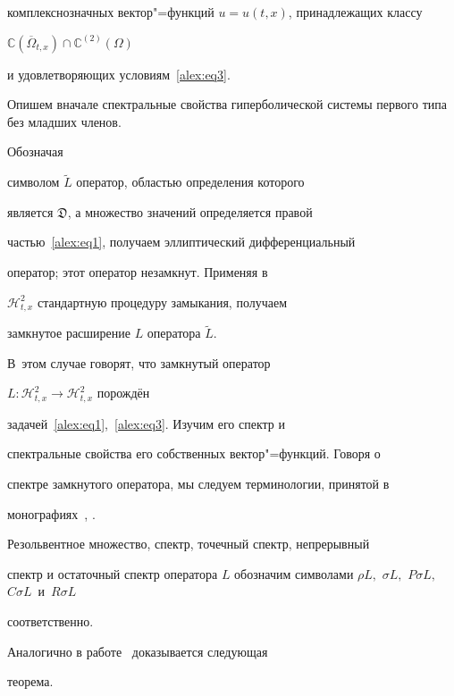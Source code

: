 комплекснозначных вектор"=функций $u=u(t,x)$, принадлежащих классу

${\mathbb{C}\left(\overline{\Omega}_{t,x}\right)}\cap{\mathbb{C}^{(2)}\left(\Omega\right)}$

и удовлетворяющих условиям~\eqref{alex:eq3}.

Опишем вначале спектральные свойства гиперболической системы первого типа без младших членов.



\smallskip



 Обозначая

символом $\widetilde{L}$ оператор, областью определения которого

является $\mathfrak{D}$, а множество значений определяется правой

частью~\eqref{alex:eq1}, получаем  эллиптический дифференциальный

оператор; этот оператор незамкнут. Применяя в

$\mathcal{H}^2_{t,x}$ стандартную процедуру замыкания, получаем

замкнутое расширение $L$ оператора $\widetilde{L}$. 

В~этом случае говорят, что замкнутый оператор

$L:\mathcal{H}^2_{t,x}\to\mathcal{H}^2_{t,x}$ порождён

задачей~\eqref{alex:eq1},~\eqref{alex:eq3}. Изучим его спектр и

спектральные свойства его собственных вектор"=функций. Говоря о

спектре замкнутого оператора, мы следуем терминологии, принятой в

монографиях~\cite[с.~25]{alex:bib5}, \cite[с.~620]{alex:bib7}.

Резольвентное множество, спектр, точечный спектр, непрерывный

спектр и остаточный спектр оператора $L$ обозначим символами $\rho

L,$ $\sigma L,$ $P\sigma L,$ $C\sigma L$~и~$R\sigma L$

соответственно.



Аналогично в работе~\cite{alex:bib11} доказывается следующая

теорема.



\smallskip

